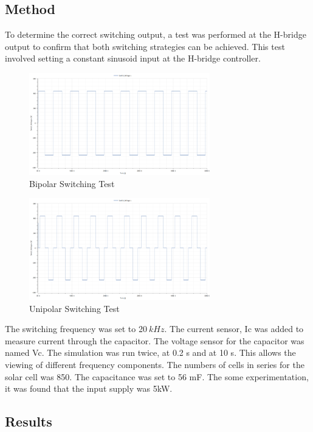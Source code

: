 \documentclass[12pt,twoside]{scrartcl}
\begin{document}
\subsection{Method}
To determine the correct switching output, a test was performed at the H-bridge output to confirm that both
switching strategies can be achieved. 
This test involved setting a constant sinusoid input at the H-bridge controller.
\begin{figure}[htp]
    \centering
    \includegraphics[width=0.7\textwidth]{Bipolar_sw.png}
    \caption{Bipolar Switching Test}
    \label{fig:Bipolar Switching}
\end{figure}
\begin{figure}[htp]
    \centering
    \includegraphics[width=0.7\textwidth]{Unipolar_sw.png}
    \caption{Unipolar Switching Test}
    \label{fig:Unipolar Switching}
\end{figure}
\newpage
\noindent
The switching frequency was set to 20$\: kHz$. The current sensor, Ic was added to measure current 
through the capacitor. The voltage sensor for the capacitor was named Vc. The simulation was run twice, at 0.2 s and at 10 s. This allows the 
viewing of different frequency components. The numbers of cells in series for the solar cell was 850. The capacitance was set to 56 mF. The some experimentation,
it was found that the input supply was 5kW.
\subsection{Results}
\end{document}
